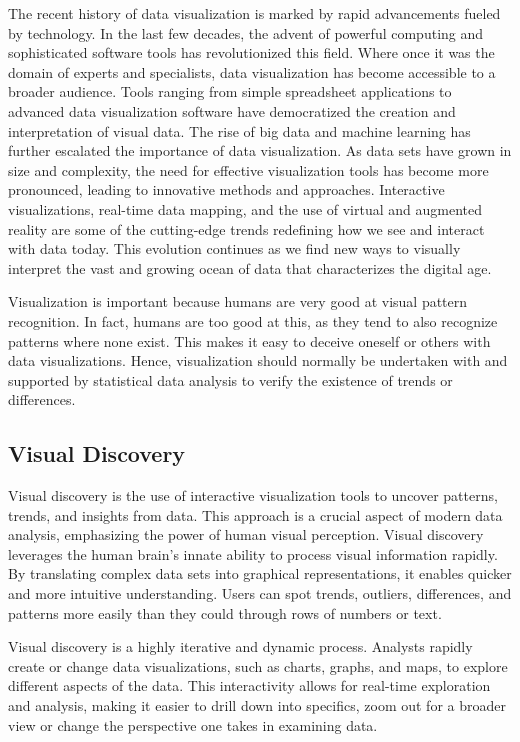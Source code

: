 The recent history of data visualization is marked by rapid advancements fueled by technology. In the last few decades, the advent of powerful computing and sophisticated software tools has revolutionized this field. Where once it was the domain of experts and specialists, data visualization has become accessible to a broader audience. Tools ranging from simple spreadsheet applications to advanced data visualization software have democratized the creation and interpretation of visual data. The rise of big data and machine learning has further escalated the importance of data visualization. As data sets have grown in size and complexity, the need for effective visualization tools has become more pronounced, leading to innovative methods and approaches. Interactive visualizations, real-time data mapping, and the use of virtual and augmented reality are some of the cutting-edge trends redefining how we see and interact with data today. This evolution continues as we find new ways to visually interpret the vast and growing ocean of data that characterizes the digital age.

Visualization is important because humans are very good at visual pattern recognition. In fact, humans are too good at this, as they tend to also recognize patterns where none exist. This makes it easy to deceive oneself or others with data visualizations. Hence, visualization should normally be undertaken with and supported by statistical data analysis to verify the existence of trends or differences.

\subsection*{Visual Discovery}

Visual discovery is the use of interactive visualization tools to uncover patterns, trends, and insights from data. This approach is a crucial aspect of modern data analysis, emphasizing the power of human visual perception. Visual discovery leverages the human brain's innate ability to process visual information rapidly. By translating complex data sets into graphical representations, it enables quicker and more intuitive understanding. Users can spot trends, outliers, differences, and patterns more easily than they could through rows of numbers or text.

Visual discovery is a highly iterative and dynamic process. Analysts rapidly create or change data visualizations, such as charts, graphs, and maps, to explore different aspects of the data. This interactivity allows for real-time exploration and analysis, making it easier to drill down into specifics, zoom out for a broader view or change the perspective one takes in examining data.

